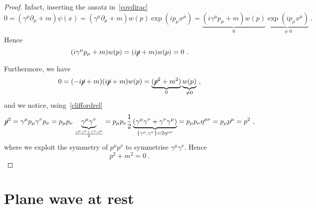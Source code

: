     \begin{proof}
        Infact, inserting the ansatz in~\eqref{covdirac}
        \begin{equation*}
            0 = (\gamma^\mu \partial_\mu + m) \psi(x) = (\gamma^\mu \partial_\mu + m) w(p) \exp(i p_\mu x^\mu) = \underbrace{(i \gamma^\mu p_\mu + m) w(p)}_0 \underbrace{\exp(i p_\mu x^\mu)}_{\neq 0} ~.
        \end{equation*}
        Hence
        \begin{equation*}
            (i \gamma^\mu p_\mu + m) w(p) = (i \cancel p + m) w(p) = 0 ~.
        \end{equation*}

        Furthermore, we have 
        \begin{equation*}
            0 = (- i \cancel p + m)(i \cancel p + m) w(p) = \underbrace{(\cancel p^2 + m^2)}_0 \underbrace{w(p)}_{\neq 0} ~,
        \end{equation*}
        and we notice, using~\eqref{cliffordrel}
        \begin{equation*}
            \cancel p^2 = \gamma^\mu p_\mu \gamma^\nu p_\nu = p_\mu p_\nu \underbrace{\gamma^\mu \gamma^\nu}_{\frac{\gamma^\mu \gamma^\nu + \gamma^\nu \gamma^\mu}{2}} = p_\mu p_\nu \frac{1}{2} \underbrace{(\gamma^\mu \gamma^\nu + \gamma^\nu \gamma^\mu)}_{\{\gamma^\mu, \gamma^\nu\} = 2 \eta^{\mu\nu}}= p_\mu p_\nu \eta^{\mu\nu} = p_\mu p^\mu = p^2 ~,
        \end{equation*}
        where we exploit the symmetry of $p^\mu p^\nu$ to symmetrise $\gamma^\mu \gamma^\nu$. Hence
        \begin{equation*}
            p^2 + m^2 = 0 ~.
        \end{equation*}
    \end{proof}

\section{Plane wave at rest}

